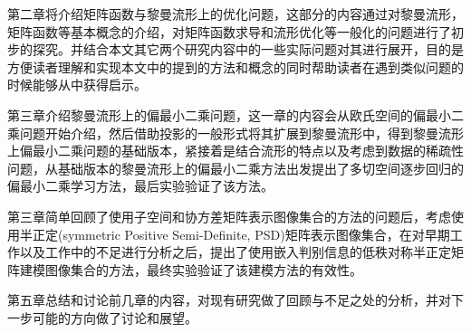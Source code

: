 第二章将介绍矩阵函数与黎曼流形上的优化问题，这部分的内容通过对黎曼流形，矩阵函数等基本概念的介绍，对矩阵函数求导和流形优化等一般化的问题进行了初步的探究。并结合本文其它两个研究内容中的一些实际问题对其进行展开，目的是方便读者理解和实现本文中的提到的方法和概念的同时帮助读者在遇到类似问题的时候能够从中获得启示。

第三章介绍黎曼流形上的偏最小二乘问题，这一章的内容会从欧氏空间的偏最小二乘问题开始介绍，然后借助投影的一般形式将其扩展到黎曼流形中，得到黎曼流形上偏最小二乘问题的基础版本，紧接着是结合流形的特点以及考虑到数据的稀疏性问题，从基础版本的黎曼流形上的偏最小二乘方法出发提出了多切空间逐步回归的偏最小二乘学习方法，最后实验验证了该方法。

第三章简单回顾了使用子空间和协方差矩阵表示图像集合的方法的问题后，考虑使用半正定(symmetric Positive Semi-Definite, PSD)矩阵表示图像集合，在对早期工作以及工作\cite{PSD_WACV}中的不足进行分析之后，提出了使用嵌入判别信息的低秩对称半正定矩阵建模图像集合的方法，最终实验验证了该建模方法的有效性。

第五章总结和讨论前几章的内容，对现有研究做了回顾与不足之处的分析，并对下一步可能的方向做了讨论和展望。